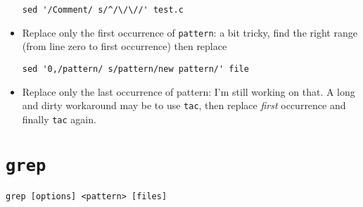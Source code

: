 \documentclass[a4paper,12pt,%
              final%
              ]{article}
\begin{document}
\begin{itemize}
\begin{verbatim}
sed '/Comment/ s/^/\/\//' test.c
\end{verbatim}
  \item Replace only the first occurrence of \verb|pattern|: a bit tricky, find the right range (from line zero to first occurrence) then replace
\begin{verbatim}
sed '0,/pattern/ s/pattern/new pattern/' file
\end{verbatim}
  \item Replace only the last occurrence of pattern: I'm still working on that. A long and dirty workaround may be to use \verb|tac|, then replace \emph{first} occurrence and finally \verb|tac| again.
\end{itemize}

\section{\texttt{grep}}
\label{sec:grep}
\verb|grep [options] <pattern> [files]|
\end{document}
